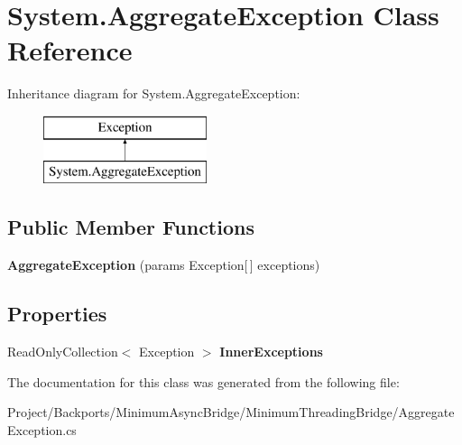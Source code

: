 \hypertarget{class_system_1_1_aggregate_exception}{}\section{System.\+Aggregate\+Exception Class Reference}
\label{class_system_1_1_aggregate_exception}
Inheritance diagram for System.\+Aggregate\+Exception\+:\begin{figure}[H]
\begin{center}
\leavevmode
\includegraphics[height=2.000000cm]{class_system_1_1_aggregate_exception}
\end{center}
\end{figure}
\subsection*{Public Member Functions}
\begin{DoxyCompactItemize}
\item 
\mbox{\label{class_system_1_1_aggregate_exception_a892fba5f00deea7485d2f74ce0784129}} 
{\bfseries Aggregate\+Exception} (params Exception\mbox{[}$\,$\mbox{]} exceptions)
\end{DoxyCompactItemize}
\subsection*{Properties}
\begin{DoxyCompactItemize}
\item 
\mbox{\label{class_system_1_1_aggregate_exception_a295c129a5f0ee297d339315d90ea2860}} 
Read\+Only\+Collection$<$ Exception $>$ {\bfseries Inner\+Exceptions}
\end{DoxyCompactItemize}


The documentation for this class was generated from the following file\+:\begin{DoxyCompactItemize}
\item 
Project/\+Backports/\+Minimum\+Async\+Bridge/\+Minimum\+Threading\+Bridge/Aggregate\+Exception.\+cs\end{DoxyCompactItemize}
